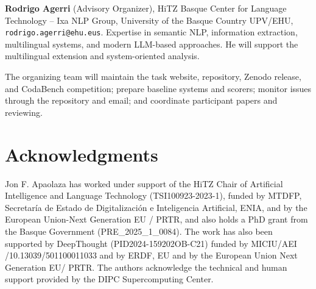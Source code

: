 \documentclass[11pt]{article}
\begin{document}
\medskip
\noindent\textbf{Rodrigo Agerri} (Advisory Organizer), HiTZ Basque Center for Language Technology -- Ixa NLP Group, University of the Basque Country UPV/EHU, \texttt{rodrigo.agerri@ehu.eus}.
Expertise in semantic NLP, information extraction, multilingual systems, and modern LLM-based approaches.
He will support the multilingual extension and system-oriented analysis.

\medskip
The organizing team will maintain the task website, repository, Zenodo release, and CodaBench competition; prepare baseline systems and scorers; monitor issues through the repository and email; and coordinate participant papers and reviewing.

\section*{Acknowledgments}
Jon F. Apaolaza has worked under support of the HiTZ Chair of Artificial Intelligence and Language Technology (TSI100923-2023-1), funded by MTDFP, Secretaría de Estado de Digitalización e Inteligencia Artificial, ENIA, and by the European Union-Next Generation EU / PRTR, and also holds a PhD grant from the Basque Government (PRE\_2025\_1\_0084).
The work has also been supported by DeepThought (PID2024-159202OB-C21) funded by MICIU/AEI /10.13039/501100011033 and by ERDF, EU and by the European Union Next Generation EU/ PRTR.
The authors acknowledge the technical and human support provided by the DIPC Supercomputing Center.


\end{document}
